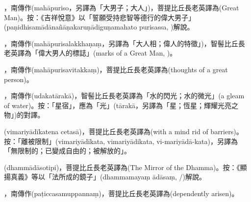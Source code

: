 \startitemgroup[noteitems]
\item{}，南傳作(mahāpuriso，另譯為「大男子；大人」)，菩提比丘長老英譯為(Great Man)。按：《吉祥悅意》以「誓願受持悲智等德行的偉大男子」(paṇidhisamādānañāṇakaruṇādiguṇamahato purisassa, )解說。
\item{}，南傳作(mahāpurisalakkhaṇaṃ，另譯為「大人相；偉人的特徵」)，智髻比丘長老英譯為「偉大男人的標誌」(marks of a Great Man, )。
\item{}，南傳作(mahāpurisavitakkaṃ)，菩提比丘長老英譯為(thoughts of a great person)。
\stopitemgroup

\startitemgroup[noteitems]
\item{}，南傳作(udakatārakā)，智髻比丘長老英譯為「水的閃光；水的微光」(a gleam of water)。按：「星宿」，應為「光」(tārakā，另譯為「星；恆星；輝耀光亮之物」)的對譯。
\stopitemgroup

\startitemgroup[noteitems]
\item{}(vimariyādīkatena cetasā)，菩提比丘長老英譯為(with a mind rid of barriers)。按：「離被限制」(vimariyādīkata, vimariyādikata, vi-mariyādā-kata)，另譯為「無限制的；已變成自由的；被解放的」。
\stopitemgroup

\startitemgroup[noteitems]
\item{}(dhammādāsotipi)，菩提比丘長老英譯為(The Mirror of the Dhamma)。按：《顯揚真義》等以「法所成的鏡子」(dhammamayaṃ ādāsaṃ, /)解說。
\stopitemgroup

\startitemgroup[noteitems]
\item{}，南傳作(paṭiccasamuppannaṃ)，菩提比丘長老英譯為(dependently arisen)。
\stopitemgroup

